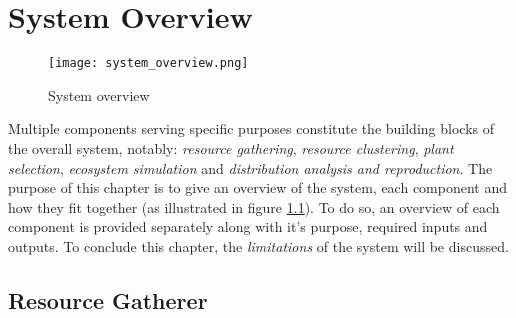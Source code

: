 \chapter{System Overview}

\begin{figure}
\center
	\texttt{[image: system\_overview.png]}
	\caption{ System overview}	
	\label{fig:system_overview}
\end{figure}

Multiple components serving specific purposes constitute the building blocks of the overall system, notably: \textit{resource gathering}, \textit{resource clustering}, \textit{plant selection}, \textit{ecosystem simulation} and \textit{distribution analysis and reproduction}. The purpose of this chapter is to give an overview of the system, each component and how they fit together (as illustrated in figure \ref{fig:system_overview}). To do so, an overview of each component is provided separately along with it's purpose, required inputs and outputs. To conclude this chapter, the \textit{limitations} of the system will be discussed. \\

\section{Resource Gatherer}

